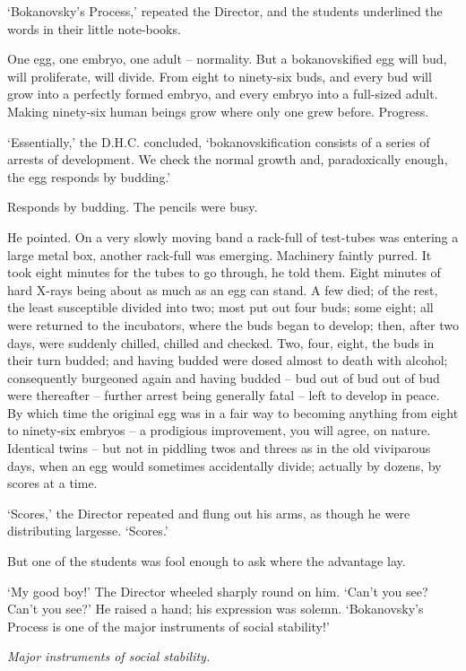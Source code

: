 \documentclass[10pt,a4paper]{article}
\newcommand{\sqm}[1]{‘#1’}
\begin{document}
\sqm{Bokanovsky's Process,} repeated the Director, and the students underlined the words in their little note-books.

One egg, one embryo, one adult – normality. But a bokanovskified egg will bud, will proliferate, will divide. From eight to ninety-six buds, and every bud will grow into a perfectly formed embryo, and every embryo into a full-sized adult. Making ninety-six human beings grow where only one grew before. Progress.

\sqm{Essentially,} the D.H.C. concluded, \sqm{bokanovskification consists of a series of arrests of development. We check the normal growth and, paradoxically enough, the egg responds by budding.}

Responds by budding. The pencils were busy.

He pointed. On a very slowly moving band a rack-full of test-tubes was entering a large metal box, another rack-full was emerging. Machinery faintly purred. It took eight minutes for the tubes to go through, he told them. Eight minutes of hard X-rays being about as much as an egg can stand. A few died; of the rest, the least susceptible divided into two; most put out four buds; some eight; all were returned to the incubators, where the buds began to develop; then, after two days, were suddenly chilled, chilled and checked. Two, four, eight, the buds in their turn budded; and having budded were dosed almost to death with alcohol; consequently burgeoned again and having budded – bud out of bud out of bud were thereafter – further arrest being generally fatal – left to develop in peace. By which time the original egg was in a fair way to becoming anything from eight to ninety-six embryos – a prodigious improvement, you will agree, on nature. Identical twins – but not in piddling twos and threes as in the old viviparous days, when an egg would sometimes accidentally divide; actually by dozens, by scores at a time.

\sqm{Scores,} the Director repeated and flung out his arms, as though he were distributing largesse. \sqm{Scores.}

But one of the students was fool enough to ask where the advantage lay.

\sqm{My good boy!} The Director wheeled sharply round on him. \sqm{Can't you see? Can't you see?} He raised a hand; his expression was solemn. \sqm{Bokanovsky's Process is one of the major instruments of social stability!}

\emph{Major instruments of social stability.}
\end{document}
